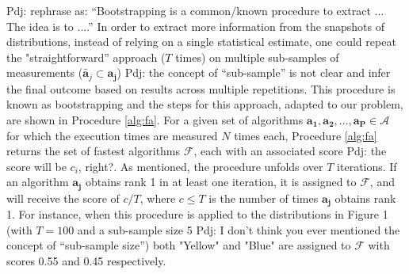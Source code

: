 \documentclass[conference]{IEEEtran}
\newcommand{\p}[1]{{\color{blue} Pdj: #1}}
\begin{document}
\p{rephrase as: ``Bootstrapping is a common/known procedure to extract ... The idea is to ....''} 
In order to extract more information from the snapshots of distributions, instead of relying on a single statistical
estimate, one could repeat the "straightforward'' approach ($T$ times) on multiple sub-samples of measurements
($\tilde{\mathbf{a}_j} \subset \mathbf{a_j}$) \p{the concept of ``sub-sample'' is not clear} and infer the final outcome
based on results across multiple repetitions. This procedure is known as bootstrapping\cite{bootstrap} and the steps for
this approach, adapted to our problem, are shown in Procedure \ref{alg:fa}. For a given set of algorithms $
\mathbf{a_1},\mathbf{a_2} ,..., \mathbf{a_P}\in \mathcal{A}$ for which the execution times are measured $N$ times each,
Procedure \ref{alg:fa} returns the set of fastest algorithms $\mathcal{F}$, each with an associated score \p{the
  score will be $c_i$, right?}. As mentioned, the procedure unfolds over $T$ iterations.
If an algorithm $\mathbf{a_j}$ obtains rank 1 in at least one iteration, it is assigned to $\mathcal{F}$, and will
receive the score of  $c/T$, where $c \le T$ is the number of times $\mathbf{a_j}$ obtains rank 1.
For instance, when this procedure is applied to the distributions in Figure 1 (with $T=100$ and a sub-sample size 5 \p{I
  don't think you ever mentioned the concept of ``sub-sample size''}) both "Yellow" and "Blue" are assigned to $\mathcal{F}$ with scores 0.55 and 0.45 respectively.
 
\end{document}
